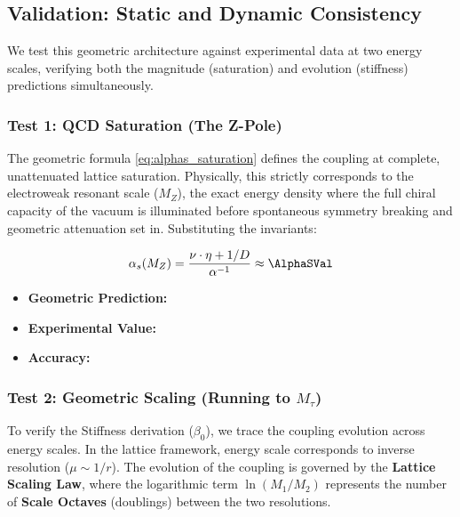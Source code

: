 \subsection{Validation: Static and Dynamic Consistency}
We test this geometric architecture against experimental data at two energy scales, verifying both the magnitude (saturation) and evolution (stiffness) predictions simultaneously.

\subsubsection{Test 1: QCD Saturation (The Z-Pole)}
The geometric formula \eqref{eq:alphas_saturation} defines the coupling at complete, unattenuated lattice saturation. Physically, this strictly corresponds to the electroweak resonant scale ($M_Z$), the exact energy density where the full chiral capacity of the vacuum is illuminated before spontaneous symmetry breaking and geometric attenuation set in. Substituting the invariants:

\begin{equation}
\alpha_s(M_Z) = \frac{\nu \cdot \eta + 1/D}{\alpha^{-1}}
\approx \mathbf{\AlphaSVal}
\end{equation}

\begin{itemize}
\item \textbf{Geometric Prediction:} \AlphaSVal
\item \textbf{Experimental Value:} \AlphaSExperimentalValue
\item \textbf{Accuracy:} \AlphaSAccText
\end{itemize}


\subsubsection{Test 2: Geometric Scaling (Running to \texorpdfstring{$M_\tau$}{Mtau})}

To verify the Stiffness derivation ($\beta_0$), we trace the coupling evolution across energy scales. In the lattice framework, energy scale corresponds to inverse resolution ($\mu \sim 1/r$). The evolution of the coupling is governed by the \textbf{Lattice Scaling Law}, where the logarithmic term $\ln(M_1/M_2)$ represents the number of \textbf{Scale Octaves} (doublings) between the two resolutions.

